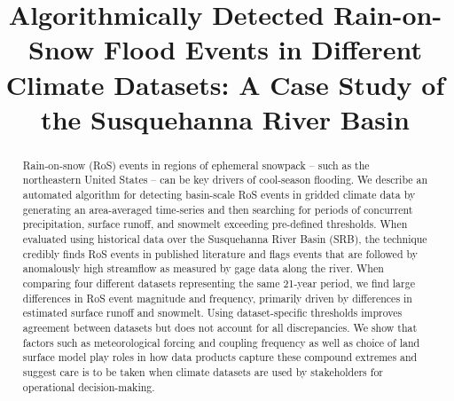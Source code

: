 \documentclass[nhess, manuscript]{copernicus}
\begin{document}



\title{Algorithmically Detected Rain-on-Snow Flood Events in Different Climate Datasets: A Case Study of the Susquehanna River Basin}



\received{}
\pubdiscuss{} %
\revised{}
\accepted{}
\published{}


\maketitle

\begin{abstract}
Rain-on-snow (RoS) events in regions of ephemeral snowpack -- such as the northeastern United States -- can be key drivers of cool-season flooding. We describe an automated algorithm for detecting basin-scale RoS events in gridded climate data by generating an area-averaged time-series and then searching for periods of concurrent precipitation, surface runoff, and snowmelt exceeding pre-defined thresholds. When evaluated using historical data over the Susquehanna River Basin (SRB), the technique credibly finds RoS events in published literature and flags events that are followed by anomalously high streamflow as measured by gage data along the river. When comparing four different datasets representing the same 21-year period, we find large differences in RoS event magnitude and frequency, primarily driven by differences in estimated surface runoff and snowmelt. Using dataset-specific thresholds improves agreement between datasets but does not account for all discrepancies. We show that factors such as meteorological forcing and coupling frequency as well as choice of land surface model play roles in how data products capture these compound extremes and suggest care is to be taken when climate datasets are used by stakeholders for operational decision-making.
\end{abstract}
\end{document}
